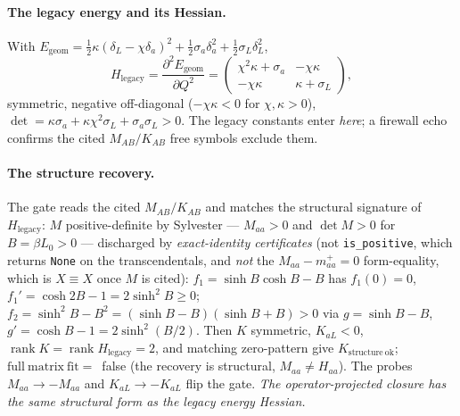 \paragraph{The legacy energy and its Hessian.}
With \(E_{\mathrm{geom}}=\tfrac12\kappa(\delta_L-\chi\delta_a)^2+\tfrac12\sigma_a
\delta_a^2+\tfrac12\sigma_L\delta_L^2\),
\[
  H_{\mathrm{legacy}}=\frac{\partial^2 E_{\mathrm{geom}}}{\partial Q^2}
  =\begin{pmatrix}\chi^2\kappa+\sigma_a & -\chi\kappa\\ -\chi\kappa & \kappa+\sigma_L\end{pmatrix},
\]
symmetric, negative off-diagonal (\(-\chi\kappa<0\) for \(\chi,\kappa>0\)),
\(\det=\kappa\sigma_a+\kappa\chi^2\sigma_L+\sigma_a\sigma_L>0\). The legacy
constants enter \emph{here}; a firewall echo confirms the cited \(M_{AB}/K_{AB}\)
free symbols exclude them.

\paragraph{The structure recovery.}
The gate reads the cited \(M_{AB}/K_{AB}\) and matches the structural signature of
\(H_{\mathrm{legacy}}\): \(M\) positive-definite by Sylvester --- \(M_{aa}>0\) and
\(\det M>0\) for \(B=\beta L_0>0\) --- discharged by \emph{exact-identity
certificates} (not \texttt{is\_positive}, which returns \texttt{None} on the
transcendentals, and \emph{not} the \(M_{aa}-m_{aa}^{+}\!=\!0\) form-equality, which
is \(X\!\equiv\!X\) once \(M\) is cited): \(f_1=\sinh B\cosh B-B\) has \(f_1(0)=0\),
\(f_1'=\cosh2B-1=2\sinh^2 B\ge0\); \(f_2=\sinh^2B-B^2=(\sinh B-B)(\sinh B+B)>0\)
via \(g=\sinh B-B\), \(g'=\cosh B-1=2\sinh^2(B/2)\). Then \(K\) symmetric,
\(K_{aL}<0\), \(\operatorname{rank}K=\operatorname{rank}H_{\mathrm{legacy}}=2\), and
matching zero-pattern give \(K_{\mathrm{structure\ ok}}\);
\(\mathrm{full\ matrix\ fit}=\)~false (the recovery is structural,
\(M_{aa}\ne H_{aa}\)). The probes \(M_{aa}\to-M_{aa}\) and \(K_{aL}\to-K_{aL}\) flip
the gate. \emph{The operator-projected closure has the same structural form as the
legacy energy Hessian.}


